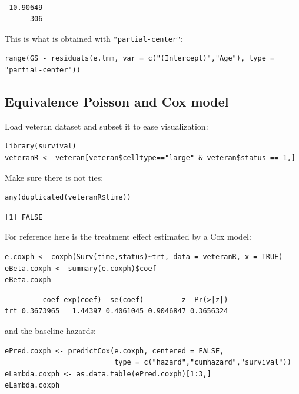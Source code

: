\documentclass{article}
\begin{document}
\begin{verbatim}

-10.90649 
      306
\end{verbatim}


This is what is obtained with \texttt{"partial-center"}:
\lstset{language=r,label= ,caption= ,captionpos=b,numbers=none}
\begin{lstlisting}
range(GS - residuals(e.lmm, var = c("(Intercept)","Age"), type = "partial-center"))
\end{lstlisting}

\subsection{Equivalence Poisson and Cox model}
\label{sec:orgef60e8b}

Load veteran dataset and subset it to ease visualization:
\lstset{language=r,label= ,caption= ,captionpos=b,numbers=none}
\begin{lstlisting}
library(survival) 
veteranR <- veteran[veteran$celltype=="large" & veteran$status == 1,]
\end{lstlisting}

Make sure there is not ties:
\lstset{language=r,label= ,caption= ,captionpos=b,numbers=none}
\begin{lstlisting}
any(duplicated(veteranR$time))
\end{lstlisting}

\begin{verbatim}
[1] FALSE
\end{verbatim}


For reference here is the treatment effect estimated by a Cox model:
\lstset{language=r,label= ,caption= ,captionpos=b,numbers=none}
\begin{lstlisting}
e.coxph <- coxph(Surv(time,status)~trt, data = veteranR, x = TRUE)
eBeta.coxph <- summary(e.coxph)$coef
eBeta.coxph
\end{lstlisting}

\begin{verbatim}
         coef exp(coef)  se(coef)         z  Pr(>|z|)
trt 0.3673965   1.44397 0.4061045 0.9046847 0.3656324
\end{verbatim}


and the baseline hazards:
\lstset{language=r,label= ,caption= ,captionpos=b,numbers=none}
\begin{lstlisting}
ePred.coxph <- predictCox(e.coxph, centered = FALSE,
                          type = c("hazard","cumhazard","survival"))
eLambda.coxph <- as.data.table(ePred.coxph)[1:3,]
eLambda.coxph
\end{lstlisting}
\end{document}
